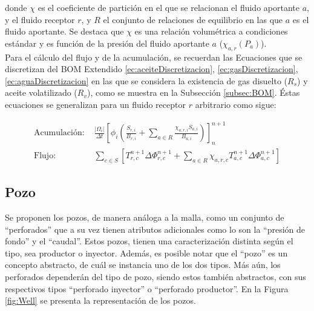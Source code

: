 donde $\chi$ es el coeficiente de partición en el que se relacionan el fluido aportante $a$, y el fluido receptor $r$, y $R$ el conjunto de relaciones de equilibrio en las que $a$ es el fluido aportante. Se destaca que $\chi$ es una relación volumétrica a condiciones estándar y es función de la presión del fluido aportante $a$ ($\chi_{a,r}\left(P_{a}\right)$).\\

Para el cálculo del flujo y de la acumulación, se recuerdan las Ecuaciones que se discretizan del BOM Extendido \ref{ec:aceiteDiscretizacion}, \ref{ec:gasDiscretizacion}, \ref{ec:aguaDiscretizacion} en las que se considera la existencia de gas disuelto ($R_{s}$) y aceite volatilizado ($R_v$), como se muestra en la Subsección \ref{subsec:BOM}. Éstas ecuaciones se generalizan para un fluido receptor $r$ arbitrario como sigue:

\begin{align}
	\label{ec:acumulacion_releq}\text{Acumulación: }&\frac{|\Omega_{i}|}{\Delta t}\left[ \phi_{i} \left( \frac{S_{r,i}}{B_{r,i}} + \sum_{a \in R}\frac{\chi_{a,r,i}S_{a,i}}{B_{a,i}}\right)\right]^{n+1}_{n}\\
	\label{ec:flujo_releq}\text{Flujo: }&\sum_{c \in S}\left[ T^{n+1}_{r,c} \Delta{\Phi_{r,c}^{n+1}} + \sum_{a \in R}\chi_{a,r,c} T^{n+1}_{a,c} \Delta{\Phi_{a,c}^{n+1}} \right]
\end{align}

\subsection{Pozo}\label{subsec:PS_Well}
Se proponen los pozos, de manera análoga a la malla, como un conjunto de ``perforados'' que a su vez tienen atributos adicionales como lo son la ``presión de fondo'' y el ``caudal''. Estos pozos, tienen una caracterización distinta según el tipo, sea productor o inyector. Además, es posible notar que el ``pozo'' es un concepto abstracto, de cuál se instancia uno de los dos tipos. Más aún, los perforados dependerán del tipo de pozo, siendo estos también abstractos, con sus respectivos tipos ``perforado inyector'' o ``perforado productor''. En la Figura \ref{fig:Well} se presenta la representación de los pozos.\\

